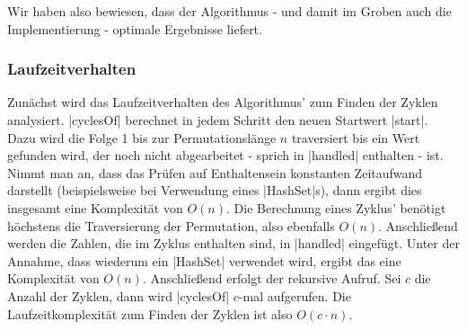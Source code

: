 Wir haben also bewiesen, dass der Algorithmus - und damit im Groben auch die Implementierung - optimale Ergebnisse liefert.

\subsubsection{Laufzeitverhalten}
\label{slow}
Zunächst wird das Laufzeitverhalten des Algorithmus' zum Finden der Zyklen analysiert.
|cyclesOf| berechnet in jedem Schritt den neuen Startwert |start|.
Dazu wird die Folge 1 bis zur Permutationslänge $n$ traversiert bis ein Wert gefunden wird, der noch nicht abgearbeitet - sprich in |handled| enthalten - ist.
Nimmt man an, dass das Prüfen auf Enthaltensein konstanten Zeitaufwand darstellt (beispielsweise bei Verwendung eines |HashSet|s), dann ergibt dies insgesamt eine Komplexität von $O(n)$.
Die Berechnung eines Zyklus' benötigt höchstens die Traversierung der Permutation, also ebenfalls $O(n)$.
Anschließend werden die Zahlen, die im Zyklus enthalten sind, in |handled| eingefügt. Unter der Annahme, dass wiederum ein |HashSet| verwendet wird, ergibt das eine Komplexität von $O(n)$.
Anschließend erfolgt der rekursive Aufruf. Sei $c$ die Anzahl der Zyklen, dann wird |cyclesOf| $c$-mal aufgerufen.
Die Laufzeitkomplexität zum Finden der Zyklen ist also $O(c \cdot n)$. 

